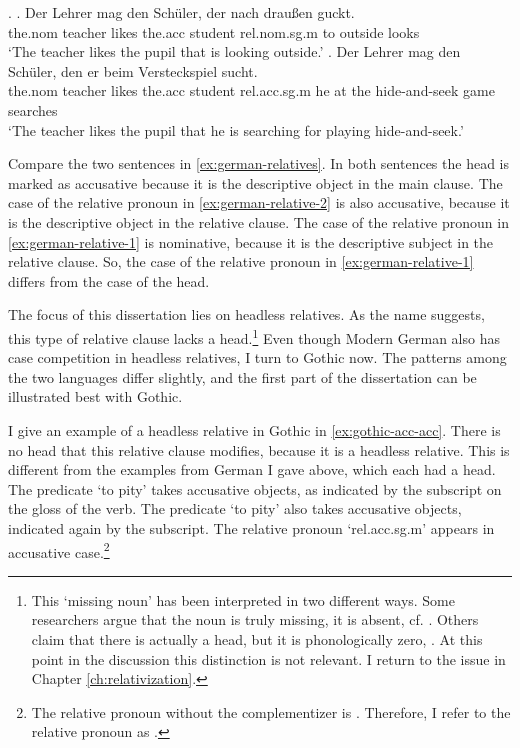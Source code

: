 \ex.\label{ex:german-relatives}
\ag. Der Lehrer mag den Schüler, der nach draußen guckt.\\
 the.\ac{nom} teacher likes the.\ac{acc} student \ac{rel}.\ac{nom}.\ac{sg}.\ac{m} to outside looks\\
 `The teacher likes the pupil that is looking outside.'\label{ex:german-relative-1}
 \bg. Der Lehrer mag den Schüler, den er beim Versteckspiel sucht.\\
 the.\ac{nom} teacher likes the.\ac{acc} student \ac{rel}.\ac{acc}.\ac{sg}.\ac{m} he {at the} {hide-and-seek game} searches\\
 `The teacher likes the pupil that he is searching for playing hide-and-seek.'\label{ex:german-relative-2}

Compare the two sentences in \ref{ex:german-relatives}. In both sentences the head is marked as accusative because it is the descriptive object in the main clause. The case of the relative pronoun in \ref{ex:german-relative-2} is also accusative, because it is the descriptive object in the relative clause. The case of the relative pronoun in \ref{ex:german-relative-1} is nominative, because it is the descriptive subject in the relative clause. So, the case of the relative pronoun in \ref{ex:german-relative-1} differs from the case of the head.

The focus of this dissertation lies on headless relatives. As the name suggests, this type of relative clause lacks a head.\footnote{
This `missing noun' has been interpreted in two different ways. Some researchers argue that the noun is truly missing, it is absent, cf. \citealt{citko2005,vanriemsdijk2006}. Others claim that there is actually a head, but it is phonologically zero, \citealt{bresnan1978,groos1981,grosu2003}. At this point in the discussion this distinction is not relevant. I return to the issue in Chapter \ref{ch:relativization}.
}
Even though Modern German also has case competition in headless relatives, I turn to Gothic now. The patterns among the two languages differ slightly, and the first part of the dissertation can be illustrated best with Gothic.

I give an example of a headless relative in Gothic in \ref{ex:gothic-acc-acc}.
There is no head that this relative clause modifies, because it is a headless relative. This is different from the examples from German I gave above, which each had a head.
The predicate  `to pity' takes accusative objects, as indicated by the subscript on the gloss of the verb. The predicate  `to pity' also takes accusative objects, indicated again by the subscript.
The relative pronoun  `\ac{rel}.\ac{acc}.\ac{sg}.\ac{m}' appears in accusative case.\footnote{
The relative pronoun without the complementizer  is . Therefore, I refer to the relative pronoun as .
}

